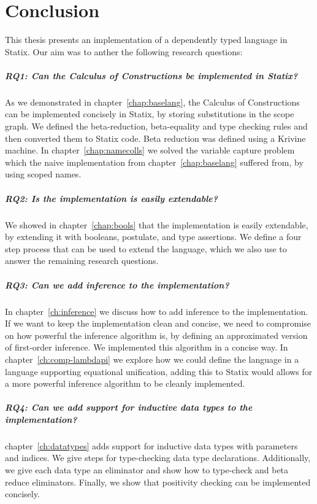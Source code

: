 \chapter{Conclusion}
\label{ch:conclusion}

This thesis presents an implementation of a dependently typed language in Statix. Our aim was to anther the following research questions:

\paragraph{RQ1: Can the Calculus of Constructions be implemented in Statix?}
As we demonstrated in chapter~\ref{chap:baselang}, the Calculus of Constructions can be implemented concisely in Statix, by storing substitutions in the scope graph. We defined the beta-reduction, beta-equality and type checking rules and then converted them to Statix code. Beta reduction was defined using a Krivine machine. In chapter~\ref{chap:namecolls} we solved the variable capture problem which the naive implementation from chapter~\ref{chap:baselang} suffered from, by using scoped names.

\paragraph{RQ2: Is the implementation is easily extendable?}
We showed in chapter~\ref{chap:bools} that the implementation is easily extendable, by extending it with booleans, postulate, and type assertions. We define a four step process that can be used to extend the language, which we also use to answer the remaining research questions.

\paragraph{RQ3: Can we add inference to the implementation?}
In chapter~\ref{ch:inference} we discuss how to add inference to the implementation. If we want to keep the implementation clean and concise, we need to compromise on how powerful the inference algorithm is, by defining an approximated version of first-order inference. We implemented this algorithm in a concise way. In chapter~\ref{ch:comp-lambdapi} we explore how we could define the language in a language supporting equational unification, adding this to Statix would allows for a more powerful inference algorithm to be cleanly implemented.

\paragraph{RQ4: Can we add support for inductive data types to the implementation?}
chapter~\ref{ch:datatypes} adds support for inductive data types with parameters and indices. We give steps for type-checking data type declarations. Additionally, we give each data type an eliminator and show how to type-check and beta reduce eliminators. Finally, we show that positivity checking can be implemented concisely.



